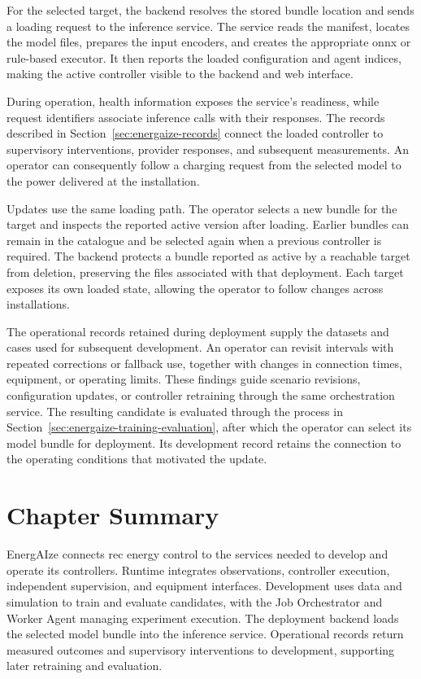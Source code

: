 For the selected target, the backend resolves the stored bundle location and sends a loading request to the inference service. The service reads the manifest, locates the model files, prepares the input encoders, and creates the appropriate \gls{onnx} or rule-based executor. It then reports the loaded configuration and agent indices, making the active controller visible to the backend and web interface.

During operation, health information exposes the service's readiness, while request identifiers associate inference calls with their responses. The records described in Section~\ref{sec:energaize-records} connect the loaded controller to supervisory interventions, provider responses, and subsequent measurements. An operator can consequently follow a charging request from the selected model to the power delivered at the installation.

Updates use the same loading path. The operator selects a new bundle for the target and inspects the reported active version after loading. Earlier bundles can remain in the catalogue and be selected again when a previous controller is required. The backend protects a bundle reported as active by a reachable target from deletion, preserving the files associated with that deployment. Each target exposes its own loaded state, allowing the operator to follow changes across installations.

The operational records retained during deployment supply the datasets and cases used for subsequent development. An operator can revisit intervals with repeated corrections or fallback use, together with changes in connection times, equipment, or operating limits. These findings guide scenario revisions, configuration updates, or controller retraining through the same orchestration service. The resulting candidate is evaluated through the process in Section~\ref{sec:energaize-training-evaluation}, after which the operator can select its model bundle for deployment. Its development record retains the connection to the operating conditions that motivated the update.

\section{Chapter Summary}
\label{sec:energAIze-forward-map}
\label{sec:energaize-chapter-map}

EnergAIze connects \gls{rec} energy control to the services needed to develop and operate its controllers. Runtime integrates observations, controller execution, independent supervision, and equipment interfaces. Development uses data and simulation to train and evaluate candidates, with the Job Orchestrator and Worker Agent managing experiment execution. The deployment backend loads the selected model bundle into the inference service. Operational records return measured outcomes and supervisory interventions to development, supporting later retraining and evaluation.

